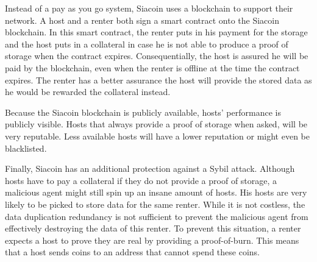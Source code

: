 \fi

Instead of a pay as you go system, Siacoin uses a blockchain to support their network. A host and a renter both sign a smart contract onto the Siacoin blockchain. In this smart contract, the renter puts in his payment for the storage and the host puts in a collateral in case he is not able to produce a proof of storage when the contract expires. Consequentially, the host is assured he will be paid by the blockchain, even when the renter is offline at the time the contract expires. The renter has a better assurance the host will provide the stored data as he would be rewarded the collateral instead.

Because the Siacoin blockchain is publicly available, hosts' performance is publicly visible. Hosts that always provide a proof of storage when asked, will be very reputable. Less available hosts will have a lower reputation or might even be blacklisted.

Finally, Siacoin has an additional protection against a Sybil attack. Although hosts have to pay a collateral if they do not provide a proof of storage, a malicious agent might still spin up an insane amount of hosts. His hosts are very likely to be picked to store data for the same renter. While it is not costless, the data duplication redundancy is not sufficient to prevent the malicious agent from effectively destroying the data of this renter. To prevent this situation, a renter expects a host to prove they are real by providing a proof-of-burn. This means that a host sends coins to an address that cannot spend these coins. \cite{siacoin}
